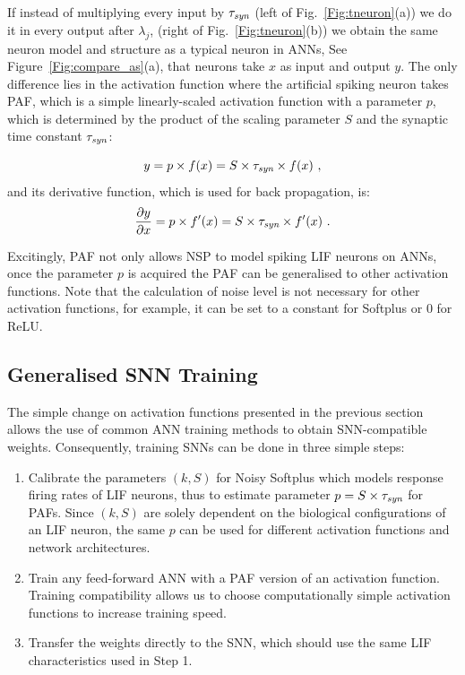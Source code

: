 	
	If instead of multiplying every input by $\tau_{\textit{\textrm{syn}}}$ (left of Fig.~\ref{Fig:tneuron}(a)) we do it in every output after $\lambda_j$, (right of Fig.~\ref{Fig:tneuron}(b)) we obtain the same neuron model and structure as a typical neuron in ANNs, See Figure~\ref{Fig:compare_as}(a), that neurons take $x$ as input and output $y$.
	The only difference lies in the activation function where the artificial spiking neuron takes PAF, which is a simple linearly-scaled activation function with a parameter $p$, which is determined by the product of the scaling parameter $S$ and the synaptic time constant $\tau_{\textit{\textrm{syn}}}$:
	
	\begin{equation}
	y = p \times f(x) = S \times \tau_{\textit{\textrm{syn}}} \times f(x)~,
	\label{equ:PAF}
	\end{equation}
	and its derivative function, which is used for back propagation, is:
	\begin{equation}
	\frac{\partial y}{\partial x} = p \times f'(x) = S \times \tau_{\textit{\textrm{syn}}} \times f'(x)~.
	\end{equation}
	
	Excitingly, PAF not only allows NSP to model spiking LIF neurons on ANNs, once the parameter $p$ is acquired the PAF can be generalised to other activation functions.
	Note that the calculation of noise level is not necessary for other activation functions, for example, it can be set to a constant for Softplus or 0 for ReLU.
	\subsection{Generalised SNN Training}
	\label{subsec:ns_train}
	
	The simple change on activation functions presented in the previous section allows the use of common ANN training methods to obtain SNN-compatible weights.
	Consequently, training SNNs can be done in three simple steps: 
	\begin{enumerate}
		\item Calibrate the parameters $(k, S)$ for Noisy Softplus which models response firing rates of LIF neurons, thus to estimate parameter $p=S \times \tau_{\textit{\textrm{syn}}}$ for PAFs. Since $(k, S)$ are solely dependent on the biological configurations of an LIF neuron, the same $p$ can be used for different activation functions and network architectures.
		\item Train any feed-forward ANN with a PAF version of an activation function.
		Training compatibility allows us to choose computationally simple activation functions to increase training speed.
		\item Transfer the weights directly to the SNN, which should use the same LIF characteristics used in Step 1.
	\end{enumerate}
	
